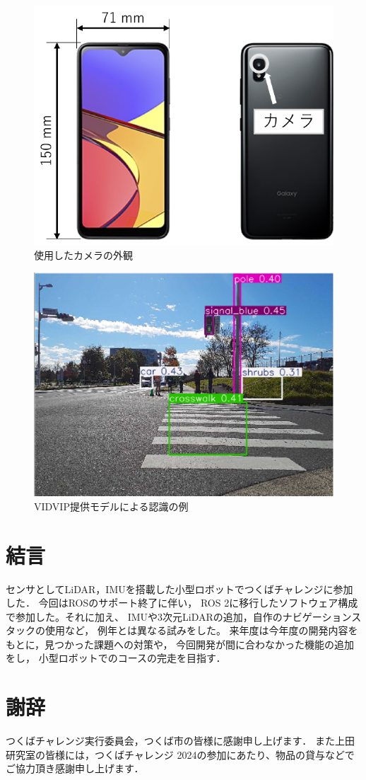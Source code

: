 \documentclass[twocolumn,9pt]{jsproceedings}
\begin{document}
\begin{figure}[h]
  \begin{center}
    \includegraphics[width=0.6\linewidth]{figs/smartphone.pdf}
    \caption{使用したカメラの外観}
    \label{fig:smartphone}
  \end{center}
\end{figure}

\begin{figure}[h]
  \begin{center}
    \includegraphics[width=0.6\linewidth]{figs/result_of_yolo.pdf}
    \caption{VIDVIP提供モデルによる認識の例}
    \label{fig:result_yolo}
  \end{center}
\end{figure}
\newpage
\section{結言}
センサとしてLiDAR，IMUを搭載した小型ロボットでつくばチャレンジに参加した．
今回はROSのサポート終了に伴い，
ROS 2に移行したソフトウェア構成で参加した。それに加え、
IMUや3次元LiDARの追加，自作のナビゲーションスタックの使用など，
例年とは異なる試みをした。
来年度は今年度の開発内容をもとに，見つかった課題への対策や，
今回開発が間に合わなかった機能の追加をし，
小型ロボットでのコースの完走を目指す．


\section*{謝辞}
つくばチャレンジ実行委員会，つくば市の皆様に感謝申し上げます．
また上田研究室の皆様には，つくばチャレンジ 2024の参加にあたり、物品の貸与などでご協力頂き感謝申し上げます．
\end{document}
